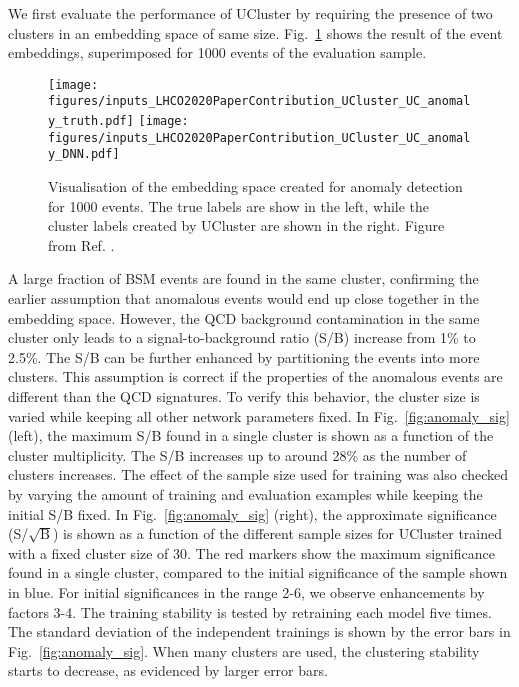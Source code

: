 \documentclass[a4paper,11pt]{article}
\begin{document}
We first evaluate the performance of UCluster by requiring the presence of two clusters in an embedding space of same size. Fig.~\ref{fig:embedding_space} shows the result of the event embeddings, superimposed for 1000 events of the evaluation sample. 

\begin{figure}[h!]
    \centering
    \texttt{[image: figures/inputs\_LHCO2020PaperContribution\_UCluster\_UC\_anomaly\_truth.pdf]}
    \texttt{[image: figures/inputs\_LHCO2020PaperContribution\_UCluster\_UC\_anomaly\_DNN.pdf]}
    \caption{Visualisation of the embedding space created for anomaly detection for 1000 events. The true labels are show in the left, while the cluster labels created by UCluster are shown in the right. Figure from Ref. \cite{Mikuni:2020qds}.}
    \label{fig:embedding_space}
\end{figure}

A large fraction of BSM events are found in the same cluster, confirming the earlier assumption that anomalous events would end up close together in the embedding space. However, the QCD background contamination in the same cluster only leads to a signal-to-background ratio (S/B) increase from 1\% to 2.5\%. The S/B can be further enhanced by partitioning the events into more clusters. This assumption is correct if the properties of the anomalous events are different than the QCD signatures. To verify this behavior, the cluster size is varied while keeping all other network parameters fixed. In Fig.~\ref{fig:anomaly_sig} (left), the maximum S/B found in a single cluster is shown as a function of the cluster multiplicity. The S/B increases up to around 28\% as the number of clusters increases. The effect of the sample size used for training was also checked by varying the amount of training and evaluation examples while keeping the initial S/B fixed. In Fig.~\ref{fig:anomaly_sig} (right), the approximate significance (S/$\sqrt{\mathrm{B}}$) is shown as a function of the different sample sizes for UCluster  trained with a fixed cluster size of 30. The red markers show the maximum significance found in a single cluster, compared to the initial significance of the sample shown in blue. For initial significances in the range 2-6, we observe enhancements by factors 3-4. The training stability is tested by retraining each model five times.  The standard deviation of the independent trainings is shown by the error bars in Fig.~\ref{fig:anomaly_sig}. When many clusters are used, the clustering stability starts to decrease, as evidenced by larger error bars.
\end{document}
